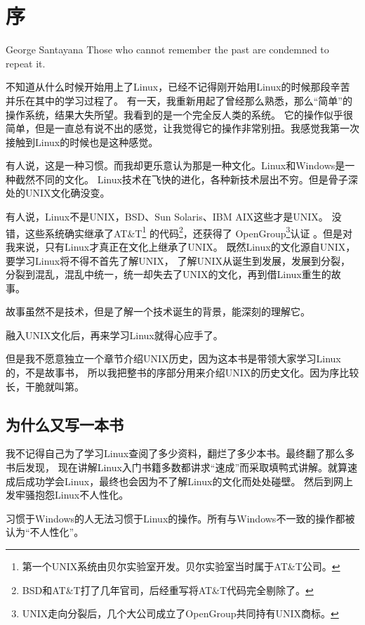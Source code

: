 
\chapter{序}
\begin{quotes}{George Santayana}
Those who cannot remember the past are condemned to repeat it.
\end{quotes}


不知道从什么时候开始用上了Linux，已经不记得刚开始用Linux的时候那段辛苦并乐在其中的学习过程了。
有一天，我重新用起了曾经那么熟悉，那么“简单”的操作系统，结果大失所望。我看到的是一个完全反人类的系统。
它的操作似乎很简单，但是一直总有说不出的感觉，让我觉得它的操作非常别扭。我感觉我第一次接触到Linux的时候也是这种感觉。

有人说，这是一种习惯。而我却更乐意认为那是一种文化。Linux和Windows是一种截然不同的文化。
Linux技术在飞快的进化，各种新技术层出不穷。但是骨子深处的UNIX文化确没变。

有人说，Linux不是UNIX，BSD、Sun Solaris、IBM AIX这些才是UNIX。
没错，这些系统确实继承了AT\&T\footnote{第一个UNIX系统由贝尔实验室开发。贝尔实验室当时属于AT\&T公司。}
的代码\footnote{BSD和AT\&T打了几年官司，后经重写将AT\&T代码完全剔除了。}，还获得了
OpenGroup\footnote{UNIX走向分裂后，几个大公司成立了OpenGroup共同持有UNIX商标。}认证
。但是对我来说，只有Linux才真正在文化上继承了UNIX。
既然Linux的文化源自UNIX，要学习Linux将不得不首先了解UNIX，
了解UNIX从诞生到发展，发展到分裂，分裂到混乱，混乱中统一，统一却失去了UNIX的文化，再到借Linux重生的故事。

故事虽然不是技术，但是了解一个技术诞生的背景，能深刻的理解它。

融入UNIX文化后，再来学习Linux就得心应手了。

但是我不愿意独立一个章节介绍UNIX历史，因为这本书是带领大家学习Linux的，不是故事书，
所以我把整书的序部分用来介绍UNIX的历史文化。因为序比较长，干脆就叫第。

\section{为什么又写一本书}

我不记得自己为了学习Linux查阅了多少资料，翻烂了多少本书。最终翻了那么多书后发现，
现在讲解Linux入门书籍多数都讲求“速成”而采取填鸭式讲解。就算速成后成功学会Linux，最终也会因为不了解Linux的文化而处处碰壁。
然后到网上发牢骚抱怨Linux不人性化。

\begin{notice}
习惯于Windows的人无法习惯于Linux的操作。所有与Windows不一致的操作都被认为“不人性化”。
\end{notice}

